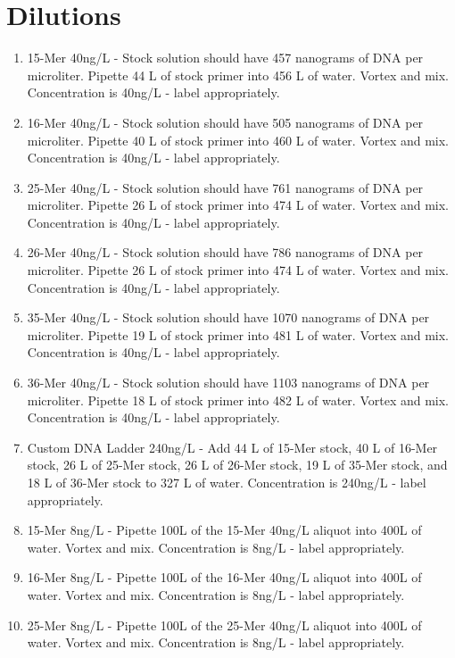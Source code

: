 \documentclass[letterpaper]{article}
\newcommand{\uL}{\micro{}L}
\begin{document}
\section{Dilutions}
\begin{enumerate}
\item{15-Mer 40ng/\uL{} - Stock solution should have 457 nanograms of DNA per microliter. Pipette 44 \uL{} of stock primer into 456 \uL{} of water. Vortex and mix. Concentration is 40ng/\uL{} - label appropriately.}
\item{16-Mer 40ng/\uL{} - Stock solution should have 505 nanograms of DNA per microliter. Pipette 40 \uL{} of stock primer into 460 \uL{} of water. Vortex and mix. Concentration is 40ng/\uL{} - label appropriately.}
\item{25-Mer 40ng/\uL{} - Stock solution should have 761 nanograms of DNA per microliter. Pipette 26 \uL{} of stock primer into 474 \uL{} of water. Vortex and mix. Concentration is 40ng/\uL{} - label appropriately.}
\item{26-Mer 40ng/\uL{} - Stock solution should have 786 nanograms of DNA per microliter. Pipette 26 \uL{} of stock primer into 474 \uL{} of water. Vortex and mix. Concentration is 40ng/\uL{} - label appropriately.}
\item{35-Mer 40ng/\uL{} - Stock solution should have 1070 nanograms of DNA per microliter. Pipette 19 \uL{} of stock primer into 481 \uL{} of water. Vortex and mix. Concentration is 40ng/\uL{} - label appropriately.}
\item{36-Mer 40ng/\uL{} - Stock solution should have 1103 nanograms of DNA per microliter. Pipette 18 \uL{} of stock primer into 482 \uL{} of water. Vortex and mix. Concentration is 40ng/\uL{} - label appropriately.}
\item{Custom DNA Ladder 240ng/\uL{} - Add 44 \uL{} of 15-Mer stock, 40 \uL{} of 16-Mer stock, 26 \uL{} of 25-Mer stock, 26 \uL{} of 26-Mer stock, 19 \uL{} of 35-Mer stock, and 18 \uL{} of 36-Mer stock to 327 \uL{} of water. Concentration is 240ng/\uL{} - label appropriately. }
\item{15-Mer 8ng/\uL{} - Pipette 100\uL{} of the 15-Mer 40ng/\uL{} aliquot into 400\uL{} of water. Vortex and mix. Concentration is 8ng/\uL{} - label appropriately.}
\item{16-Mer 8ng/\uL{} - Pipette 100\uL{} of the 16-Mer 40ng/\uL{} aliquot into 400\uL{} of water. Vortex and mix. Concentration is 8ng/\uL{} - label appropriately.}
\item{25-Mer 8ng/\uL{} - Pipette 100\uL{} of the 25-Mer 40ng/\uL{} aliquot into 400\uL{} of water. Vortex and mix. Concentration is 8ng/\uL{} - label appropriately.}

\end{enumerate}
\end{document}
